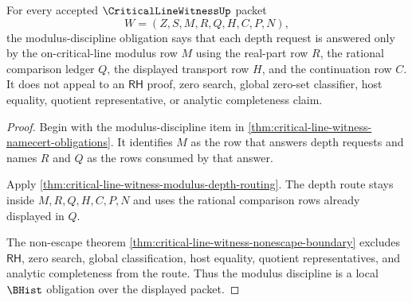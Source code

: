 \begin{theorem}
\label{thm:critical-line-witness-obligation-modulus-discipline-row}
For every accepted $\CriticalLineWitnessUp$ packet
$$
W=(Z,S,M,R,Q,H,C,P,N),
$$
the modulus-discipline obligation says that each depth request is answered only by the on-critical-line modulus row $M$ using the real-part row $R$, the rational comparison ledger $Q$, the displayed transport row $H$, and the continuation row $C$. It does not appeal to an $\mathsf{RH}$ proof, zero search, global zero-set classifier, host equality, quotient representative, or analytic completeness claim.
\end{theorem}
\begin{proof}
Begin with the modulus-discipline item in \autoref{thm:critical-line-witness-namecert-obligations}. It identifies $M$ as the row that answers depth requests and names $R$ and $Q$ as the rows consumed by that answer.

Apply \autoref{thm:critical-line-witness-modulus-depth-routing}. The depth route stays inside $M,R,Q,H,C,P,N$ and uses the rational comparison rows already displayed in $Q$.

The non-escape theorem \autoref{thm:critical-line-witness-nonescape-boundary} excludes $\mathsf{RH}$, zero search, global classification, host equality, quotient representatives, and analytic completeness from the route. Thus the modulus discipline is a local $\BHist$ obligation over the displayed packet.
\end{proof}

